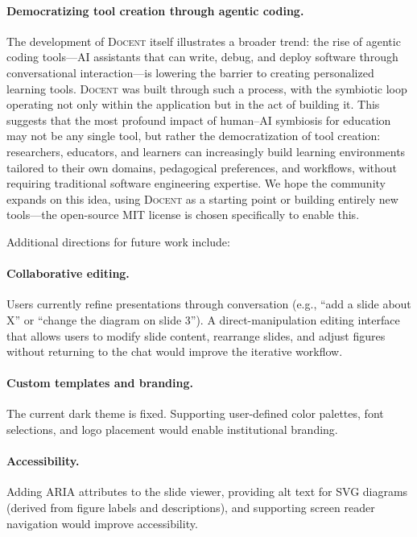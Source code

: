 \documentclass[11pt,a4paper]{article}
\newcommand{\system}{\textsc{Docent}\xspace}
\begin{document}
\paragraph{Democratizing tool creation through agentic coding.}
The development of \system itself illustrates a broader trend: the rise of agentic coding tools---AI assistants that can write, debug, and deploy software through conversational interaction---is lowering the barrier to creating personalized learning tools.
\system was built through such a process, with the symbiotic loop operating not only within the application but in the act of building it.
This suggests that the most profound impact of human--AI symbiosis for education may not be any single tool, but rather the democratization of tool creation: researchers, educators, and learners can increasingly build learning environments tailored to their own domains, pedagogical preferences, and workflows, without requiring traditional software engineering expertise.
We hope the community expands on this idea, using \system as a starting point or building entirely new tools---the open-source MIT license is chosen specifically to enable this.

Additional directions for future work include:

\paragraph{Collaborative editing.}
Users currently refine presentations through conversation (e.g., ``add a slide about X'' or ``change the diagram on slide 3'').
A direct-manipulation editing interface that allows users to modify slide content, rearrange slides, and adjust figures without returning to the chat would improve the iterative workflow.

\paragraph{Custom templates and branding.}
The current dark theme is fixed.
Supporting user-defined color palettes, font selections, and logo placement would enable institutional branding.

\paragraph{Accessibility.}
Adding ARIA attributes to the slide viewer, providing alt text for SVG diagrams (derived from figure labels and descriptions), and supporting screen reader navigation would improve accessibility.
\end{document}
